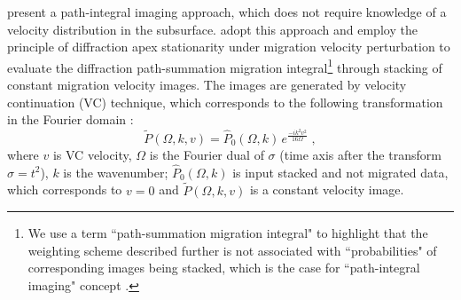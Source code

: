 \cite{landa06} present a path-integral imaging approach, which
does not require knowledge of a velocity distribution in the subsurface.
\cite{burnett11} adopt this approach and employ the principle of
diffraction apex stationarity under migration velocity perturbation \cite[]{novais06} to evaluate
the diffraction path-summation migration integral\footnote{We use a term ``path-summation migration integral" to highlight that
the weighting scheme described further is not associated with ``probabilities" of corresponding images
being stacked, which is the case for ``path-integral imaging" concept \cite[]{landa06}.} through stacking of constant migration
velocity images. The images are generated by velocity continuation (VC) 
technique, which corresponds to the following transformation in the Fourier domain \cite[]{fomel_2003a}:
\begin{equation}
\label{eq:vc}
\tilde{P}(\Omega,k,v) = \hat{P}_0 (\Omega,k)\,e^{\frac{-i k^2 v^2 }{16\Omega}}\;,
\end{equation}
where $v$ is VC velocity, $\Omega$ is the Fourier dual of $\sigma$ (time axis after the transform $\sigma=t^2$), $k$ is the wavenumber; $\hat{P}_0 (\Omega,k)$ 
is input stacked and not migrated data, which corresponds to $v=0$ and
$\tilde{P}(\Omega,k,v)$ is a constant velocity image.

